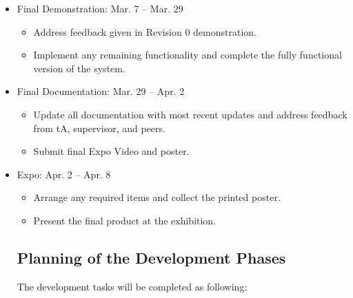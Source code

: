 \documentclass[12pt]{article}
\begin{document}
\begin{itemize}
  \item Final Demonstration: Mar. 7 -- Mar. 29 
  \begin{itemize}
    \item Address feedback given in Revision 0 demonstration.
    \item Implement any remaining functionality and complete the fully functional version of the system.
  \end{itemize}

  \item Final Documentation: Mar. 29 -- Apr. 2 
  \begin{itemize}
    \item Update all documentation with most recent updates and address feedback from tA, supervisor, and peers.
    \item Submit final Expo Video and poster.
  \end{itemize}

  \item Expo: Apr. 2 -- Apr. 8 
  \begin{itemize}
    \item Arrange any required items and collect the printed poster. 
    \item Present the final product at the exhibition.
  \end{itemize}

\subsection{Planning of the Development Phases}

The development tasks will be completed as following: 


\end{itemize}
\end{document}
